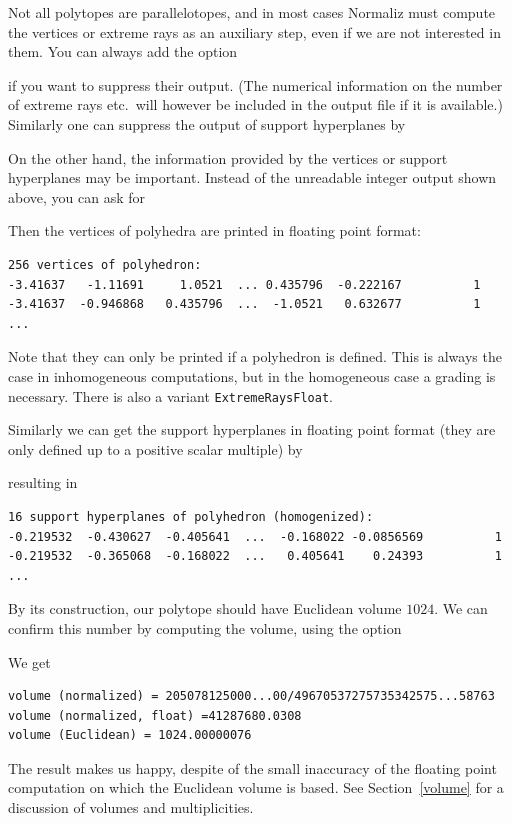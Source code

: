 Not all polytopes are parallelotopes, and in most cases Normaliz must compute the vertices or extreme rays as an auxiliary step, even if we are not interested in them. You can always add the option
\begin{itemize}
	\itemtt [NoExtRaysOutput]
\end{itemize}
if you want to suppress their output. (The numerical information on the number of extreme rays etc.\ will however be included in the output file if it is available.) Similarly one can suppress the output of support hyperplanes by
\begin{itemize}
	\itemtt [NoSuppHypsOutput]
\end{itemize}

On the other hand, the information provided by the vertices or support hyperplanes may be important. Instead of the unreadable integer output shown above, you can ask for
\begin{itemize}
	\itemtt [VerticesFloat]
\end{itemize}
Then the vertices of polyhedra are printed in floating point format:
\begin{Verbatim}
256 vertices of polyhedron:
-3.41637   -1.11691     1.0521  ... 0.435796  -0.222167          1 
-3.41637  -0.946868   0.435796  ...  -1.0521   0.632677          1
...
\end{Verbatim}
Note that they can only be printed if a polyhedron is defined. This is always the case in inhomogeneous computations, but in the homogeneous case a grading is necessary. There is also a variant \verb|ExtremeRaysFloat|.

Similarly we can get the support hyperplanes in floating point format (they are only defined up to a positive scalar multiple) by
\begin{itemize}
	\itemtt [SuppHypsFloat]
\end{itemize}
resulting in
\begin{Verbatim}
16 support hyperplanes of polyhedron (homogenized):
-0.219532  -0.430627  -0.405641  ...  -0.168022 -0.0856569          1 
-0.219532  -0.365068  -0.168022  ...   0.405641    0.24393          1 
...  
\end{Verbatim}

By its construction, our polytope should have Euclidean volume $1024$. We can confirm this number by computing the volume, using the option
\begin{itemize}
	\itemtt [Volume, -V]
\end{itemize}
We get
\begin{Verbatim}
volume (normalized) = 205078125000...00/49670537275735342575...58763
volume (normalized, float) =41287680.0308
volume (Euclidean) = 1024.00000076
\end{Verbatim}
The result makes us happy, despite of the small inaccuracy of the floating point computation on which the Euclidean volume is based. See Section~\ref{volume} for a discussion of volumes and multiplicities.

